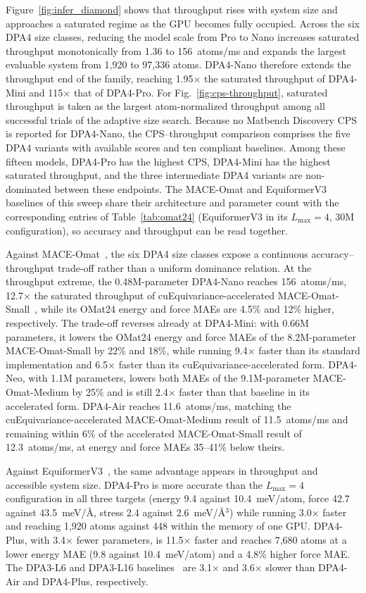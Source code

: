 Figure~\ref{fig:infer_diamond} shows that throughput rises with system size and approaches a saturated regime as the GPU becomes fully occupied.
Across the six DPA4 size classes, reducing the model scale from Pro to Nano increases saturated throughput monotonically from 1.36 to 156~atoms/ms and expands the largest evaluable system from 1{,}920 to 97{,}336 atoms.
DPA4-Nano therefore extends the throughput end of the family, reaching 1.95$\times$ the saturated throughput of DPA4-Mini and 115$\times$ that of DPA4-Pro.
For Fig.~\ref{fig:cps-throughput}, saturated throughput is taken as the largest atom-normalized throughput among all successful trials of the adaptive size search.
Because no Matbench Discovery CPS is reported for DPA4-Nano, the CPS--throughput comparison comprises the five DPA4 variants with available scores and ten compliant baselines.
Among these fifteen models, DPA4-Pro has the highest CPS, DPA4-Mini has the highest saturated throughput, and the three intermediate DPA4 variants are non-dominated between these endpoints.
The MACE-Omat and EquiformerV3 baselines of this sweep share their architecture and parameter count with the corresponding entries of Table~\ref{tab:omat24} (EquiformerV3 in its $L_{\max}=4$, 30M configuration), so accuracy and throughput can be read together.

Against MACE-Omat~\cite{batatia2022mace,batatia2025crosslearning}, the six DPA4 size classes expose a continuous accuracy--throughput trade-off rather than a uniform dominance relation.
At the throughput extreme, the 0.48M-parameter DPA4-Nano reaches 156~atoms/ms, 12.7$\times$ the saturated throughput of cuEquivariance-accelerated MACE-Omat-Small~\cite{nvidia_cuequivariance}, while its OMat24 energy and force MAEs are 4.5\% and 12\% higher, respectively.
The trade-off reverses already at DPA4-Mini: with 0.66M parameters, it lowers the OMat24 energy and force MAEs of the 8.2M-parameter MACE-Omat-Small by 22\% and 18\%, while running 9.4$\times$ faster than its standard implementation and 6.5$\times$ faster than its cuEquivariance-accelerated form.
DPA4-Neo, with 1.1M parameters, lowers both MAEs of the 9.1M-parameter MACE-Omat-Medium by 25\% and is still 2.4$\times$ faster than that baseline in its accelerated form.
DPA4-Air reaches 11.6~atoms/ms, matching the cuEquivariance-accelerated MACE-Omat-Medium result of 11.5~atoms/ms and remaining within 6\% of the accelerated MACE-Omat-Small result of 12.3~atoms/ms, at energy and force MAEs 35--41\% below theirs.

Against EquiformerV3~\cite{liao2026equiformerv3}, the same advantage appears in throughput and accessible system size.
DPA4-Pro is more accurate than the $L_{\max}=4$ configuration in all three targets (energy 9.4 against 10.4~meV/atom, force 42.7 against 43.5~meV/\AA{}, stress 2.4 against 2.6~meV/\AA$^3$) while running 3.0$\times$ faster and reaching 1{,}920 atoms against 448 within the memory of one GPU.
DPA4-Plus, with 3.4$\times$ fewer parameters, is 11.5$\times$ faster and reaches 7{,}680 atoms at a lower energy MAE (9.8 against 10.4~meV/atom) and a 4.8\% higher force MAE.
The DPA3-L6 and DPA3-L16 baselines~\cite{zhang2025dpa3} are 3.1$\times$ and 3.6$\times$ slower than DPA4-Air and DPA4-Plus, respectively.



